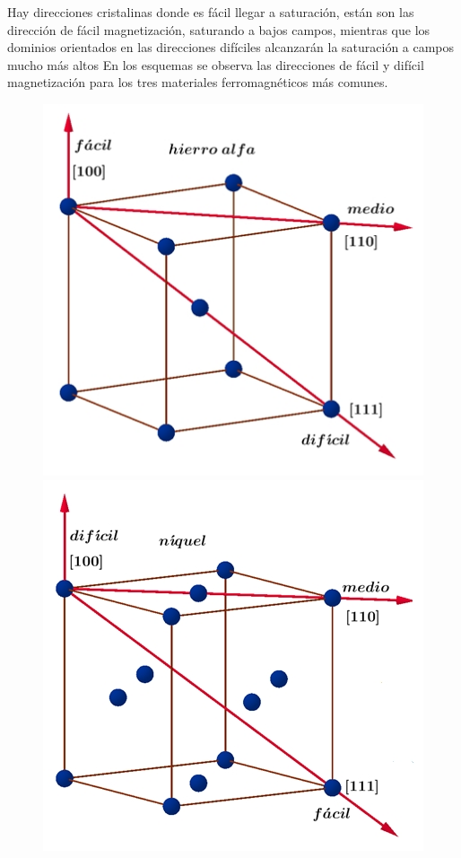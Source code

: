 Hay direcciones cristalinas donde es fácil llegar a saturación, están son las dirección de fácil magnetización, saturando a bajos campos, mientras que los dominios orientados en las direcciones difíciles alcanzarán la saturación a campos mucho más altos En los esquemas se observa las direcciones de fácil y difícil magnetización para los tres materiales ferromagnéticos más comunes.

\begin{figure}[H]
  \centering
  \begin{minipage}[b]{0.47\textwidth}
    \raggedright
     \includegraphics[width=1.10\textwidth]{./Figures/policristalino1}
  \end{minipage}
  \hfill
  \begin{minipage}[b]{0.47\textwidth}
    \raggedleft
     \includegraphics[width=1.10\textwidth]{./Figures/policristalino2}

\end{minipage}
\end{figure}
